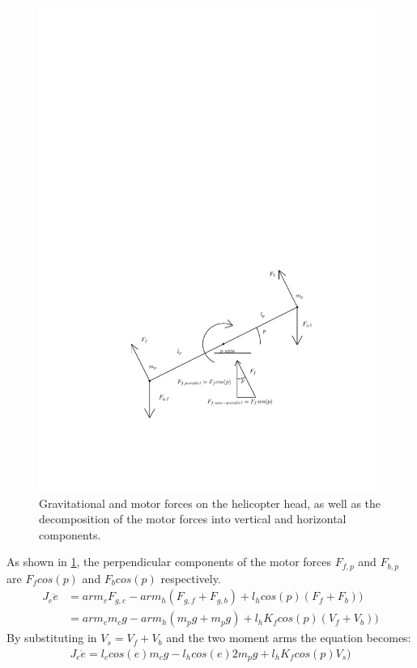 \begin{figure}[H]
  \caption{Gravitational and motor forces on the helicopter head, as
    well as the decomposition of the motor forces into vertical and
    horizontal components.}
  \label{fig:pitch_model}
  \includegraphics[width=1\textwidth]{images/pitch_model}
\end{figure}
%
As shown in \cref{fig:pitch_model}, the perpendicular components of the
motor forces $F_{f,p}$ and $F_{b,p}$ are $F_fcos(p)$ and $F_bcos(p)$
respectively.
%
\begin{align*}
  J_e\ddot{e} &= arm_cF_{g,c} - arm_h(F_{g,f}+F_{g,b}) + l_hcos(p)(F_f + F_b)) \\
              &= arm_cm_cg - arm_h(m_pg + m_pg) + l_hK_fcos(p)(V_f + V_b))
\end{align*}
%
By substituting in $V_s = V_f + V_b$ and the two moment arms the equation becomes:
%
\begin{align*}
  J_e\ddot{e} = l_ccos(e)m_cg - l_hcos(e)2m_pg + l_hK_fcos(p)V_s)
\end{align*}
